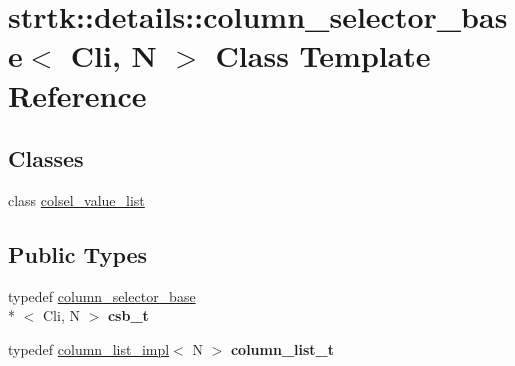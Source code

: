 \hypertarget{classstrtk_1_1details_1_1column__selector__base}{\section{strtk\-:\-:details\-:\-:column\-\_\-selector\-\_\-base$<$ Cli, N $>$ Class Template Reference}
\label{classstrtk_1_1details_1_1column__selector__base}
}
\subsection*{Classes}
\begin{DoxyCompactItemize}
\item 
class \hyperlink{classstrtk_1_1details_1_1column__selector__base_1_1colsel__value__list}{colsel\-\_\-value\-\_\-list}
\end{DoxyCompactItemize}
\subsection*{Public Types}
\begin{DoxyCompactItemize}
\item 
\hypertarget{classstrtk_1_1details_1_1column__selector__base_aaeb9350cd0b63a5e1555a353ea485c3f}{typedef \hyperlink{classstrtk_1_1details_1_1column__selector__base}{column\-\_\-selector\-\_\-base}\\*
$<$ Cli, N $>$ {\bfseries csb\-\_\-t}}\label{classstrtk_1_1details_1_1column__selector__base_aaeb9350cd0b63a5e1555a353ea485c3f}

\item 
\hypertarget{classstrtk_1_1details_1_1column__selector__base_a5a3c318443405936d314427b5e43da52}{typedef \hyperlink{structstrtk_1_1details_1_1column__list__impl}{column\-\_\-list\-\_\-impl}$<$ N $>$ {\bfseries column\-\_\-list\-\_\-t}}\label{classstrtk_1_1details_1_1column__selector__base_a5a3c318443405936d314427b5e43da52}

\end{DoxyCompactItemize}
